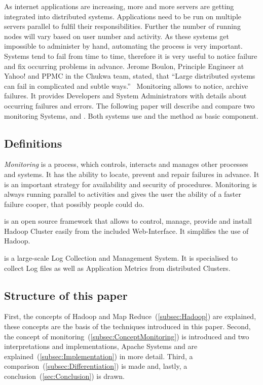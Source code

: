 As internet applications are increasing, more and more servers are getting integrated into distributed systems.\cite{Dinu2011} Applications need to be run on multiple servers parallel to fulfil their responsibilities. Further the number of running nodes will vary based on user number and activity.\cite{Jammes2012} As these systems get impossible to administer by hand, automating the process is very important.\cite{Jammes2012} Systems tend to fail from time to time, therefore it is very useful to notice failure and fix occurring problems in advance. Jerome Boulon, Principle Engineer at Yahoo! and PPMC in the Chukwa team, stated, that ``Large distributed systems can fail in complicated and subtle ways.''~\cite{Boulonb} Monitoring allows to notice, archive failures. It provides Developers and System Administrators with details about occurring failures and errors. The following paper will describe and compare two monitoring Systems, \amb and \chuk. Both systems use \hadoop and the \mr method as basic component.\cite{ApacheSoftwareFoundation2015}


\subsection{Definitions}

\textit{Monitoring} is a process, which controls, interacts and manages other processes and systems. It has the ability to locate, prevent and repair failures in advance. It is an important strategy for availability and security of procedures. Monitoring is always running parallel to activities and gives the user the ability of a faster failure cooper, that possibly people could do.\cite{Jammes2012}

\amb is an open source framework that allows to control, manage, provide and install Hadoop Cluster easily from the included Web-Interface. It simplifies the use of Hadoop.\cite{Hortonworks2013}

\chuk is a large-scale Log Collection and Management System. It is specialised to collect Log files as well as Application Metrics from distributed Clusters.

\subsection{Structure of this paper}
First, the concepts of Hadoop and Map Reduce~(\ref{subsec:Hadoop}) are explained, these concepts are the basis of the techniques introduced in this paper. 
Second, the concept of monitoring~(\ref{subsec:ConceptMonitoring}) is introduced and two interpretations and implementations, Apache Systems \amb and \chuk are explained~(\ref{subsec:Implementation}) in more detail. 
Third, a comparison~(\ref{subsec:Differentiation}) is made and, lastly, a conclusion~(\ref{sec:Conclusion}) is drawn.

